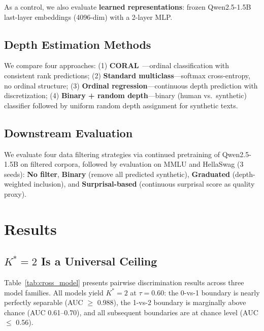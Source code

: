 \documentclass[11pt,a4paper]{article}
\begin{document}
As a control, we also evaluate \textbf{learned representations}: frozen Qwen2.5-1.5B last-layer embeddings (4096-dim) with a 2-layer MLP.

\subsection{Depth Estimation Methods}

We compare four approaches: (1) \textbf{CORAL}~\cite{cao2020rank}---ordinal classification with consistent rank predictions; (2) \textbf{Standard multiclass}---softmax cross-entropy, no ordinal structure; (3) \textbf{Ordinal regression}---continuous depth prediction with discretization; (4) \textbf{Binary + random depth}---binary (human vs.\ synthetic) classifier followed by uniform random depth assignment for synthetic texts.

\subsection{Downstream Evaluation}

We evaluate four data filtering strategies via continued pretraining of Qwen2.5-1.5B on filtered corpora, followed by evaluation on MMLU and HellaSwag (3 seeds):
\textbf{No filter}, \textbf{Binary} (remove all predicted synthetic), \textbf{Graduated} (depth-weighted inclusion), and \textbf{Surprisal-based} (continuous surprisal score as quality proxy).

\section{Results}

\subsection{$K^*=2$ Is a Universal Ceiling}

Table~\ref{tab:cross_model} presents pairwise discrimination results across three model families.
All models yield $K^*=2$ at $\tau=0.60$: the 0-vs-1 boundary is nearly perfectly separable (AUC $\geq$ 0.988), the 1-vs-2 boundary is marginally above chance (AUC 0.61--0.70), and all subsequent boundaries are at chance level (AUC $\leq$ 0.56).
\end{document}
